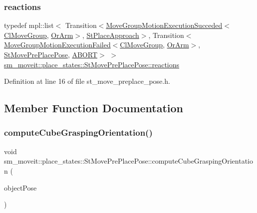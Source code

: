 \subsubsection{\texorpdfstring{reactions}{reactions}}
{\footnotesize\ttfamily typedef mpl\+::list$<$ Transition$<$\hyperlink{structmoveit__z__client_1_1MoveGroupMotionExecutionSucceded}{Move\+Group\+Motion\+Execution\+Succeded}$<$\hyperlink{classmoveit__z__client_1_1ClMoveGroup}{Cl\+Move\+Group}, \hyperlink{classsm__moveit_1_1OrArm}{Or\+Arm}$>$, \hyperlink{structsm__moveit_1_1place__states_1_1StPlaceApproach}{St\+Place\+Approach}$>$, Transition$<$\hyperlink{structmoveit__z__client_1_1MoveGroupMotionExecutionFailed}{Move\+Group\+Motion\+Execution\+Failed}$<$\hyperlink{classmoveit__z__client_1_1ClMoveGroup}{Cl\+Move\+Group}, \hyperlink{classsm__moveit_1_1OrArm}{Or\+Arm}$>$, \hyperlink{structsm__moveit_1_1place__states_1_1StMovePrePlacePose}{St\+Move\+Pre\+Place\+Pose}, \hyperlink{classABORT}{A\+B\+O\+RT}$>$ $>$ \hyperlink{structsm__moveit_1_1place__states_1_1StMovePrePlacePose_aba9e304feab2249eac1087dd2e4f6719}{sm\+\_\+moveit\+::place\+\_\+states\+::\+St\+Move\+Pre\+Place\+Pose\+::reactions}}



Definition at line 16 of file st\+\_\+move\+\_\+preplace\+\_\+pose.\+h.



\subsection{Member Function Documentation}
\mbox{\label{structsm__moveit_1_1place__states_1_1StMovePrePlacePose_add6f85ba0aa1e3905645881ecd0ba4e1}} 
\subsubsection{\texorpdfstring{compute\+Cube\+Grasping\+Orientation()}{computeCubeGraspingOrientation()}}
{\footnotesize\ttfamily void sm\+\_\+moveit\+::place\+\_\+states\+::\+St\+Move\+Pre\+Place\+Pose\+::compute\+Cube\+Grasping\+Orientation (\begin{DoxyParamCaption}\item[{geometry\+\_\+msgs\+::\+Pose\+Stamped \&}]{object\+Pose }\end{DoxyParamCaption})\hspace{0.3cm}{\ttfamily [inline]}}




